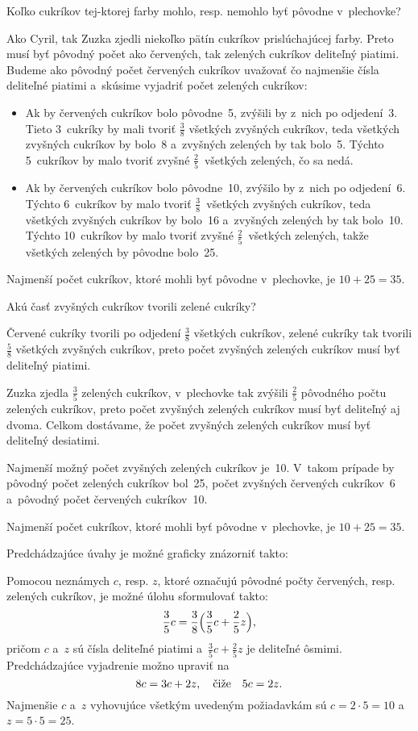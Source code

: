{%
\napad
Koľko cukríkov tej-ktorej farby mohlo, resp. nemohlo byť pôvodne v~plechovke?

\riesenie
Ako Cyril, tak Zuzka zjedli niekoľko pätín cukríkov prislúchajúcej farby.
Preto musí byť pôvodný počet ako červených, tak zelených cukríkov deliteľný piatimi.
Budeme ako pôvodný počet červených cukríkov uvažovať čo najmenšie čísla deliteľné piatimi a~skúsime vyjadriť počet zelených cukríkov:

\begin{itemize}
\item Ak by červených cukríkov bolo pôvodne~5, zvýšili by z~nich po odjedení~3.
Tieto 3~cukríky by mali tvoriť $\frac38$ všetkých zvyšných cukríkov, teda všetkých zvyšných cukríkov by bolo~8 a~zvyšných zelených by tak bolo~5.
Týchto 5~cukríkov by malo tvoriť zvyšné $\frac25$~všetkých zelených, čo sa nedá.
\item Ak by červených cukríkov bolo pôvodne~10, zvýšilo by z~nich po odjedení~6.
Týchto 6~cukríkov by malo tvoriť $\frac38$~všetkých zvyšných cukríkov, teda všetkých zvyšných cukríkov by bolo~16 a~zvyšných zelených by tak bolo~10.
Týchto 10~cukríkov by malo tvoriť zvyšné $\frac25$~všetkých zelených, takže všetkých zelených by pôvodne bolo~25.
\end{itemize}

Najmenší počet cukríkov, ktoré mohli byť pôvodne v~plechovke, je $10+25=35$.

\napadd
Akú časť zvyšných cukríkov tvorili zelené cukríky?

\ineriesenie
Červené cukríky tvorili po odjedení $\frac38$ všetkých cukríkov,
zelené cukríky tak tvorili $\frac58$ všetkých zvyšných cukríkov, preto počet zvyšných zelených cukríkov musí byť deliteľný piatimi.

Zuzka zjedla $\frac35$ zelených cukríkov, v~plechovke tak zvýšili $\frac25$ pôvodného počtu zelených cukríkov, preto počet zvyšných zelených cukríkov musí byť deliteľný aj dvoma.
Celkom dostávame, že počet zvyšných zelených cukríkov musí byť deliteľný desiatimi.

Najmenší možný počet zvyšných zelených cukríkov je~10.
V~takom prípade by pôvodný počet zelených cukríkov bol~25, počet zvyšných červených cukríkov~6 a~pôvodný počet červených cukríkov~10.

Najmenší počet cukríkov, ktoré mohli byť pôvodne v~plechovke, je $10+25=35$.

\poznamka
Predchádzajúce úvahy je možné graficky znázorniť takto:
%


Pomocou neznámych $c$, resp. $z$, ktoré označujú pôvodné počty červených, resp. zelených cukríkov, je možné úlohu sformulovať takto:
$$
\frac35c=\frac38\Bigl(\frac35c+\frac25z\Bigr),
$$
pričom $c$ a~$z$ sú čísla deliteľné piatimi a~$\frac35c+\frac25z$ je deliteľné ôsmimi.
Predchádzajúce vyjadrenie možno upraviť na
$$
\postdisplaypenalty 10000
8c=3c+2z,\quad\text{čiže}\quad 5c=2z.
$$
Najmenšie $c$ a~$z$ vyhovujúce všetkým uvedeným požiadavkám sú $c=2\cdot5=10$ a~$z=5\cdot5=25$.
}

